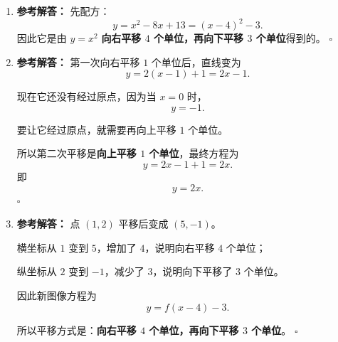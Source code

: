 \documentclass[11pt,a4paper,fontset=fandol]{ctexart}
\newenvironment{solution}{\par\noindent\textbf{参考解答：}}{\hfill$\square$\par}
\begin{document}
\begin{enumerate}
  \item \begin{solution}
  先配方：
  \[
  y=x^2-8x+13=(x-4)^2-3.
  \]
  因此它是由 $y=x^2$ \textbf{向右平移 $4$ 个单位，再向下平移 $3$ 个单位}得到的。
  \end{solution}

  \item \begin{solution}
  第一次向右平移 $1$ 个单位后，直线变为
  \[
  y=2(x-1)+1=2x-1.
  \]

  现在它还没有经过原点，因为当 $x=0$ 时，
  \[
  y=-1.
  \]

  要让它经过原点，就需要再向上平移 $1$ 个单位。

  所以第二次平移是\textbf{向上平移 $1$ 个单位}，最终方程为
  \[
  y=2x-1+1=2x.
  \]
  即
  \[
  \boxed{y=2x}.
  \]
  \end{solution}

  \item \begin{solution}
  点 $(1,2)$ 平移后变成 $(5,-1)$。

  横坐标从 $1$ 变到 $5$，增加了 $4$，说明向右平移 $4$ 个单位；

  纵坐标从 $2$ 变到 $-1$，减少了 $3$，说明向下平移了 $3$ 个单位。

  因此新图像方程为
  \[
  \boxed{y=f(x-4)-3}.
  \]

  所以平移方式是：\textbf{向右平移 $4$ 个单位，再向下平移 $3$ 个单位}。
  \end{solution}
\end{enumerate}
\end{document}
